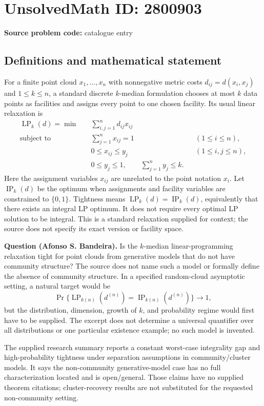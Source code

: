 \documentclass[11pt]{article}
\begin{document}
\section*{UnsolvedMath ID: 2800903}
\textbf{Source problem code:} catalogue entry
\subsection{Definitions and mathematical statement}
For a finite point cloud $x_1,\ldots,x_n$ with nonnegative metric costs $d_{ij}=d(x_i,x_j)$ and $1\leq k\leq n$, a standard discrete $k$-median formulation chooses at most $k$ data points as facilities and assigns every point to one chosen facility. Its usual linear relaxation is
\[
 \begin{aligned}
 \operatorname{LP}_k(d)=\min\quad&\sum_{i,j=1}^{n}d_{ij}x_{ij}\\
 \text{subject to}\quad&\sum_{j=1}^{n}x_{ij}=1&& (1\leq i\leq n),\\
 &0\leq x_{ij}\leq y_j&& (1\leq i,j\leq n),\\
 &0\leq y_j\leq1,\qquad\sum_{j=1}^{n}y_j\leq k.
 \end{aligned}
\]
Here the assignment variables $x_{ij}$ are unrelated to the point notation $x_i$. Let $\operatorname{IP}_k(d)$ be the optimum when assignments and facility variables are constrained to $\{0,1\}$. Tightness means $\operatorname{LP}_k(d)=\operatorname{IP}_k(d)$, equivalently that there exists an integral LP optimum. It does not require every optimal LP solution to be integral. This is a standard relaxation supplied for context; the source does not specify its exact version or facility space.

\textbf{Question (Afonso S. Bandeira).} Is the $k$-median linear-programming relaxation tight for point clouds from generative models that do not have community structure? The source does not name such a model or formally define the absence of community structure. In a specified random-cloud asymptotic setting, a natural target would be
\[
 \Pr\{\operatorname{LP}_{k(n)}(d^{(n)})=\operatorname{IP}_{k(n)}(d^{(n)})\}\longrightarrow1,
\]
but the distribution, dimension, growth of $k$, and probability regime would first have to be supplied. The excerpt does not determine a universal quantifier over all distributions or one particular existence example; no such model is invented.

The supplied research summary reports a constant worst-case integrality gap and high-probability tightness under separation assumptions in community/cluster models. It says the non-community generative-model case has no full characterization located and is open/general. Those claims have no supplied theorem citations; cluster-recovery results are not substituted for the requested non-community setting.
\end{document}
